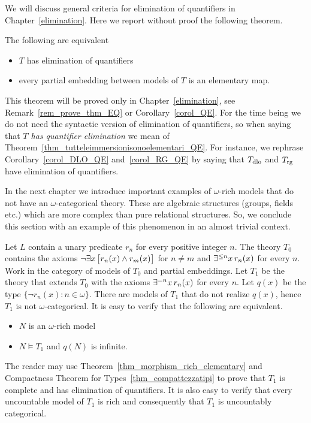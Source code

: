We will discuss general criteria for elimination of quantifiers in Chapter~\ref{elimination}.
Here we report without proof the following theorem.

\begin{theorem}\label{thm_tutteleimmersionisonoelementari_QE}
The following are equivalent
\begin{itemize}
\item[1.] $T$ has elimination of quantifiers
\item[2.] every partial embedding between models of $T$ is an elementary map.
\end{itemize}
\end{theorem}

\noindent\llap{\textcolor{red}{\Large\warning}\kern1.5ex}This theorem will be proved only in Chapter~\ref{elimination}, see Remark~\ref{rem_prove_thm_EQ} or Corollary~\ref{corol_QE}.
%
For the time being we do not need the syntactic version of elimination of quantifiers, so when saying that \textit{$T$ has quantifier elimination\/} we mean  of Theorem~\ref{thm_tutteleimmersionisonoelementari_QE}.
For instance, we rephrase Corollary~\ref{corol_DLO_QE} and~\ref{corol_RG_QE} by saying that $T_{\rm dlo}$ and $T_{\rm rg}$ have elimination of quantifiers.

In the next chapter we introduce important examples of $\omega$-rich models that do not have an $\omega$-categorical theory.
These are algebraic structures (groups, fields etc.) which are more complex than pure relational structures.
So, we conclude this section with an example of this phenomenon in an almost trivial context.

\begin{example}\label{ex_infiniti_colori}
Let $L$ contain a unary predicate $r_n$ for every positive integer $n$.
The theory $T_0$ contains the axioms $\neg\exists x\, \big[r_n(x)\wedge r_m(x)\big]$ for $n\neq m$ and $\exists^{\le n}x\,r_n(x)$ for every $n$.
Work in the category of models of $T_0$ and partial embeddings.
Let $T_1$ be the theory that extends $T_0$ with the axioms $\exists^{= n} x\, r_n(x)$ for every  $n$.
Let $q(x)$ be the type $\big\{\neg r_n(x):n\in\omega\big\}$.
There are models of $T_1$ that do not realize $q(x)$, hence $T_1$ is not $\omega$-categorical.
It is easy to verify that the following are equivalent.
\begin{itemize}
 \item[1.] $N$ is an $\omega$-rich model
 \item[2.] $N\models T_1$ and  $q(N)$ is infinite.
\end{itemize}
The reader may use Theorem~\ref{thm_morphism_rich_elementary} and Compactness Theorem for Types~\ref{thm_compattezzatipi} to prove that $T_1$ is complete and has elimination of quantifiers.
It is also easy to verify that every uncountable model of $T_1$ is rich and consequently that $T_1$ is uncountably categorical.
\end{example}

